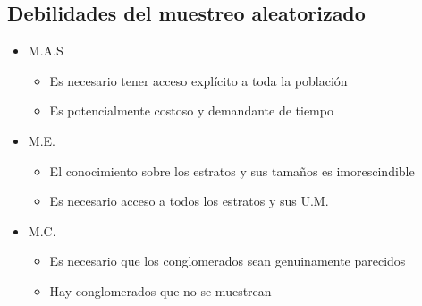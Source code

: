 \documentclass{report}
\begin{document}
\subsection{Debilidades del muestreo aleatorizado}
\begin{itemize}
	\item M.A.S
	      \begin{itemize}
		      \item Es necesario tener acceso explícito a toda la población
		      \item Es potencialmente costoso y demandante de tiempo
	      \end{itemize}
	\item M.E.
	      \begin{itemize}
		      \item El conocimiento sobre los estratos y sus tamaños es imorescindible
		      \item Es necesario acceso a todos los estratos y sus U.M.
	      \end{itemize}
	\item M.C.
	      \begin{itemize}
		      \item Es necesario que los conglomerados sean genuinamente parecidos
		      \item Hay conglomerados que no se muestrean
	      \end{itemize}
\end{itemize}
\end{document}
